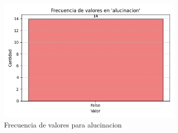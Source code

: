 \documentclass{article}
\begin{document}
\begin{figure}[H]
\centering
\includegraphics[width=0.8\textwidth]{../graficos/alucinacion_frecuencias.png}
\caption{Frecuencia de valores para alucinacion}
\end{figure}
\end{document}
